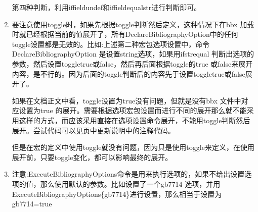 \begin{enumerate}
        第四种判断，利用iffieldundef和iffieldequalstr进行判断即可。

    \item 要注意使用toggle时，如果先根据toggle判断然后定义，这种情况下在bbx 加载时就已经根据当前的值展开了，所有DeclareBibliographyOption中的任何toggle设置都是无效的。比如:上述第二种宏包选项设置中，命令DeclareBibliographyOption 是设置string选项，如果用ifstrequal 判断出选项的参数，然后设置toggletrue或false，然后再后面根据toggle的true 或false来展开内容，是不行的。因为后面的toggle判断后的内容先于设置toggletrue或false展开了。

        如果在文档正文中看，toggle设置为true没有问题，但就是没有bbx 文件中对应设置为true 的展开。需要根据选项宏包设置而进行不同的展开那么就不能采用这样的方式，而应该采用直接在选项设置命令展开，不能用toggle判断然后展开。尝试代码可以见\pageref{up:161207}页中更新说明中的注释代码。

        但是在宏的定义中使用toggle就没有问题，因为只是使用toggle来定义，在使用展开前，只要toggle变化，都可以影响最终的展开。


    \item 注意:ExecuteBibliographyOptions命令是用来执行选项的，如果不给出设置选项的值，那么使用默认的参数。比如设置了一个gb7714 选项，并用ExecuteBibliographyOptions\{gb7714\}进行设置，那么相当于设置为gb7714=true

  \end{enumerate}


